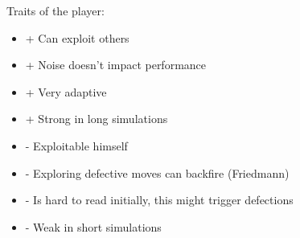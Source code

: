 \documentclass[11pt,twoside]{article}
\begin{document}
Traits of the player:


\renewcommand{\labelitemi}{}
\begin{itemize}
	\item + Can exploit others
	\item + Noise doesn't impact performance
	\item + Very adaptive
	\item + Strong in long simulations
	\item - Exploitable himself
	\item - Exploring defective moves can backfire (Friedmann)
	\item - Is hard to read initially, this might trigger defections
	\item - Weak in short simulations
\end{itemize}
\renewcommand{\labelitemi}{$\bullet$}

\newpage
\end{document}
